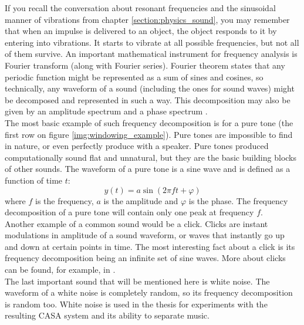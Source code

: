 If you recall the conversation about resonant frequencies and the sinusoidal manner of vibrations from chapter \ref{section:physics_sound}, you may remember that when an impulse is delivered to an object, the object responds to it by entering into vibrations. It starts to vibrate at all possible frequencies, but not all of them survive. An important mathematical instrument for frequency analysis is Fourier transform (along with Fourier series). Fourier theorem states that any periodic function might be represented as a sum of sines and cosines, so technically, any waveform of a sound (including the ones for sound waves) might be decomposed and represented in such a way. This decomposition may also be given by an amplitude spectrum and a phase spectrum \cite{Schnupp2011}.\\

The most basic example of such frequency decomposition is for a pure tone (the first row on figure \ref{img:windowing_example}). Pure tones are impossible to find in nature, or even perfectly produce with a speaker. Pure tones produced computationally sound flat and unnatural, but they are the basic building blocks of other sounds. The waveform of a pure tone is a sine wave and is defined as a function of time $t$:
\begin{equation}
	y(t) = a\sin(2\pi{}ft + \varphi)
\end{equation}
where $f$ is the frequency, $a$ is the amplitude and $\varphi$ is the phase. The frequency decomposition of a pure tone will contain only one peak at frequency $f$.\\

Another example of a common sound would be a click. Clicks are instant modulations in amplitude of a sound waveform, or waves that instantly go up and down at certain points in time. The most interesting fact about a click is its frequency decomposition being an infinite set of sine waves. More about clicks can be found, for example, in \cite{Schnupp2011}.\\

The last important sound that will be mentioned here is white noise. The waveform of a white noise is completely random, so its frequency decomposition is random too. White noise is used in the thesis for experiments with the resulting CASA system and its ability to separate music.\\


